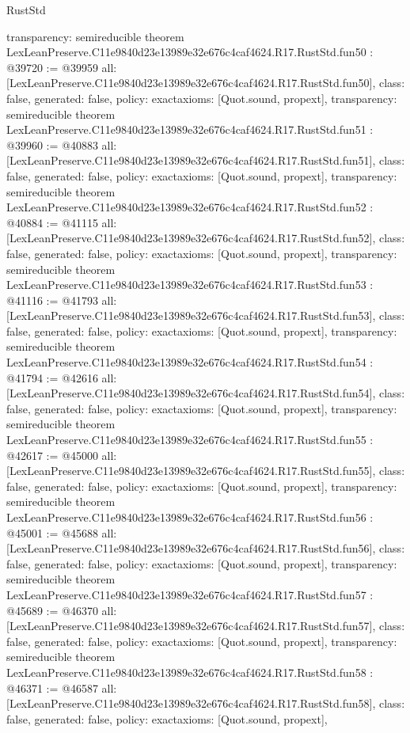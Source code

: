 \begin{lexlean}{RustStd}
\begin{coremodule}
{  transparency: semireducible
}
theorem LexLeanPreserve.C11e9840d23e13989e32e676c4caf4624.R17.RustStd.fun50 : @39720 := @39959 {
  all: [LexLeanPreserve.C11e9840d23e13989e32e676c4caf4624.R17.RustStd.fun50],
  class: false,
  generated: false,
  policy: exact{axioms: [Quot.sound, propext]},
  transparency: semireducible
}
theorem LexLeanPreserve.C11e9840d23e13989e32e676c4caf4624.R17.RustStd.fun51 : @39960 := @40883 {
  all: [LexLeanPreserve.C11e9840d23e13989e32e676c4caf4624.R17.RustStd.fun51],
  class: false,
  generated: false,
  policy: exact{axioms: [Quot.sound, propext]},
  transparency: semireducible
}
theorem LexLeanPreserve.C11e9840d23e13989e32e676c4caf4624.R17.RustStd.fun52 : @40884 := @41115 {
  all: [LexLeanPreserve.C11e9840d23e13989e32e676c4caf4624.R17.RustStd.fun52],
  class: false,
  generated: false,
  policy: exact{axioms: [Quot.sound, propext]},
  transparency: semireducible
}
theorem LexLeanPreserve.C11e9840d23e13989e32e676c4caf4624.R17.RustStd.fun53 : @41116 := @41793 {
  all: [LexLeanPreserve.C11e9840d23e13989e32e676c4caf4624.R17.RustStd.fun53],
  class: false,
  generated: false,
  policy: exact{axioms: [Quot.sound, propext]},
  transparency: semireducible
}
theorem LexLeanPreserve.C11e9840d23e13989e32e676c4caf4624.R17.RustStd.fun54 : @41794 := @42616 {
  all: [LexLeanPreserve.C11e9840d23e13989e32e676c4caf4624.R17.RustStd.fun54],
  class: false,
  generated: false,
  policy: exact{axioms: [Quot.sound, propext]},
  transparency: semireducible
}
theorem LexLeanPreserve.C11e9840d23e13989e32e676c4caf4624.R17.RustStd.fun55 : @42617 := @45000 {
  all: [LexLeanPreserve.C11e9840d23e13989e32e676c4caf4624.R17.RustStd.fun55],
  class: false,
  generated: false,
  policy: exact{axioms: [Quot.sound, propext]},
  transparency: semireducible
}
theorem LexLeanPreserve.C11e9840d23e13989e32e676c4caf4624.R17.RustStd.fun56 : @45001 := @45688 {
  all: [LexLeanPreserve.C11e9840d23e13989e32e676c4caf4624.R17.RustStd.fun56],
  class: false,
  generated: false,
  policy: exact{axioms: [Quot.sound, propext]},
  transparency: semireducible
}
theorem LexLeanPreserve.C11e9840d23e13989e32e676c4caf4624.R17.RustStd.fun57 : @45689 := @46370 {
  all: [LexLeanPreserve.C11e9840d23e13989e32e676c4caf4624.R17.RustStd.fun57],
  class: false,
  generated: false,
  policy: exact{axioms: [Quot.sound, propext]},
  transparency: semireducible
}
theorem LexLeanPreserve.C11e9840d23e13989e32e676c4caf4624.R17.RustStd.fun58 : @46371 := @46587 {
  all: [LexLeanPreserve.C11e9840d23e13989e32e676c4caf4624.R17.RustStd.fun58],
  class: false,
  generated: false,
  policy: exact{axioms: [Quot.sound, propext]},
}
\end{coremodule}
\end{lexlean}
